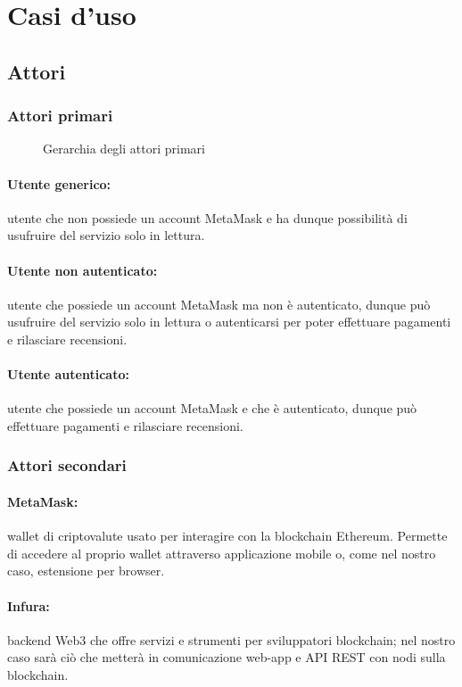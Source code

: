 \section{Casi d'uso}

\subsection{Attori}
\subsubsection{Attori primari}

\begin{figure}[htbp]
    \centering
    
    \caption{Gerarchia degli attori primari}
  \end{figure}


\paragraph*{Utente generico:} utente che non possiede un account MetaMask e ha dunque possibilità di usufruire del servizio solo in lettura.
\paragraph*{Utente non autenticato:} utente che possiede un account MetaMask ma non è autenticato, dunque può usufruire del servizio solo in lettura o autenticarsi per poter effettuare pagamenti e rilasciare recensioni.
\paragraph*{Utente autenticato:} utente che possiede un account MetaMask e che è autenticato, dunque può effettuare pagamenti e rilasciare recensioni.
\subsubsection{Attori secondari}
\paragraph*{MetaMask:} wallet di criptovalute usato per interagire con la blockchain Ethereum. Permette di accedere al proprio wallet attraverso applicazione mobile o, come nel nostro caso, estensione per browser.
\paragraph*{Infura:} backend Web3 che offre servizi e strumenti per sviluppatori blockchain; nel nostro caso sarà ciò che metterà in comunicazione web-app e API REST con nodi sulla blockchain.

